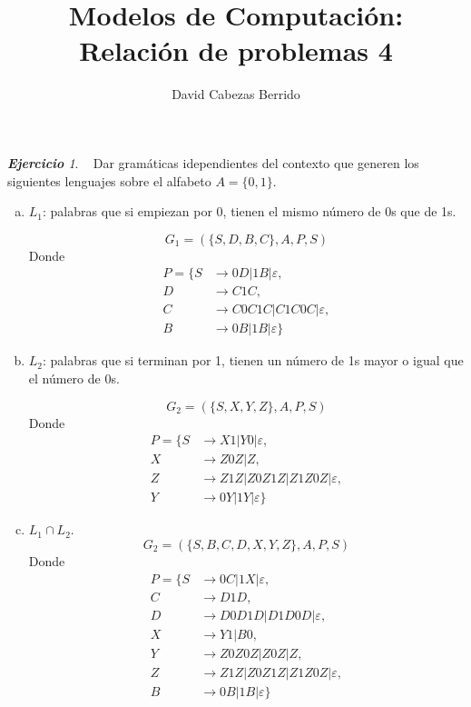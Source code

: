 \documentclass[12pt,spanish]{article}
\theoremstyle{definition}
\theoremstyle{remark}
\newtheorem{exercise}{\textbf{Ejercicio}}%
\begin{document}
\title{Modelos de Computación: \\ Relación de problemas 4}
\author{David Cabezas Berrido}
\date{\vspace{-5mm}}
\maketitle

\setcounter{exercise}{13}

\begin{exercise}~ Dar gramáticas idependientes del contexto que
  generen los siguientes lenguajes sobre el alfabeto $A=\{0,1\}$.

  \begin{enumerate}[a)]
  \item $L_1$: palabras que si empiezan por 0, tienen el mismo número
    de 0s que de 1s.

    \[G_1=(\{S,D,B,C\},A,P,S)\]
    Donde \vspace{-5mm}
    \begin{align*}
      P=\{S&\rightarrow 0D|1B|\varepsilon, \\
      D&\rightarrow C1C, \\
      C&\rightarrow C0C1C|C1C0C|\varepsilon, \\
      B&\rightarrow 0B|1B|\varepsilon\}
    \end{align*}
    
  \item $L_2$: palabras que si terminan por 1, tienen un número de 1s
    mayor o igual que el número de 0s.

    \[G_2=(\{S,X,Y,Z\},A,P,S)\]
    Donde \vspace{-5mm}
    \begin{align*}
      P=\{S&\rightarrow X1|Y0|\varepsilon, \\
      X&\rightarrow Z0Z|Z, \\
      Z&\rightarrow Z1Z|Z0Z1Z|Z1Z0Z|\varepsilon, \\
      Y&\rightarrow 0Y|1Y|\varepsilon\}
    \end{align*}

  \item $L_1\cap L_2$.
    \[G_2=(\{S,B,C,D,X,Y,Z\},A,P,S)\]
    Donde \vspace{-5mm}
    \begin{align*}
      P=\{S&\rightarrow 0C|1X|\varepsilon, \\
      C&\rightarrow D1D, \\
      D&\rightarrow D0D1D|D1D0D|\varepsilon, \\
      X&\rightarrow Y1|B0, \\
      Y&\rightarrow Z0Z0Z|Z0Z|Z, \\
      Z&\rightarrow Z1Z|Z0Z1Z|Z1Z0Z|\varepsilon, \\
      B&\rightarrow 0B|1B|\varepsilon\}
    \end{align*}
  \end{enumerate}
  
\end{exercise}
\end{document}
